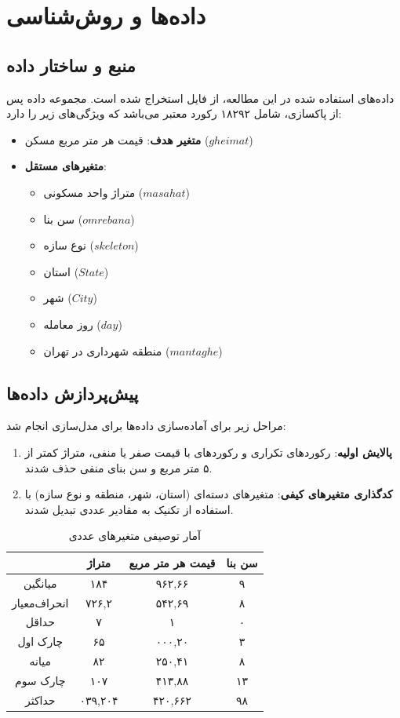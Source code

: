 \documentclass[twoside,reqno]{amsart}
\begin{document}
\section{داده‌ها و روش‌شناسی}
\subsection{منبع و ساختار داده}
داده‌های استفاده شده در این مطالعه، از فایل  استخراج شده است. مجموعه داده پس از پاکسازی، شامل ۱۸۲۹۲ رکورد معتبر می‌باشد که ویژگی‌های زیر را دارد:
\begin{itemize}
    \item \textbf{متغیر هدف}: قیمت هر متر مربع مسکن ($gheimat$)
    \item \textbf{متغیرهای مستقل}: 
    \begin{itemize}
        \item متراژ واحد مسکونی ($masahat$)
        \item سن بنا ($omre bana$)
        \item نوع سازه ($skeleton$)
        \item استان ($State$)
        \item شهر ($City$)
        \item روز معامله ($day$)
        \item منطقه شهرداری در تهران ($mantaghe$)

    \end{itemize}
\end{itemize}

\subsection{پیش‌پردازش داده‌ها}
 مراحل زیر برای آماده‌سازی داده‌ها برای مدل‌سازی انجام شد:
\begin{enumerate}
    \item \textbf{پالایش اولیه}: رکوردهای تکراری و رکوردهای با قیمت صفر یا منفی،  متراژ کمتر از ۵ متر مربع و سن بنای منفی حذف شدند.
    \item \textbf{کدگذاری متغیرهای کیفی}: متغیرهای دسته‌ای (استان، شهر، منطقه و نوع سازه) با استفاده از تکنیک  به مقادیر عددی تبدیل شدند.
\end{enumerate}

\begin{table}
\caption{آمار توصیفی متغیرهای عددی}
\begin{tabular}{|c|c|c|c|}
\hline
& متراژ & قیمت هر متر مربع & سن بنا \\
\hline
میانگین & ۱۸۴ &  ۹۶۲,۶۶  & ۹ \\
انحراف‌معیار &  ۷۲۶,۲   & ۵۴۲,۶۹  & ۸ \\
حداقل & ۷ & ۱ & ۰ \\
چارک اول & ۶۵ & ۰۰۰,۲۰ & ۳ \\
میانه & ۸۲ & ۲۵۰,۴۱ & ۸ \\
چارک سوم & ۱۰۷ &  ۴۱۳,۸۸  & ۱۳ \\
حداکثر & ۰۳۹,۲۰۴ & ۴۲۰,۶۶۲  & ۹۸ \\
\hline
\end{tabular}
\label{tab1}
\end{table}
\end{document}
